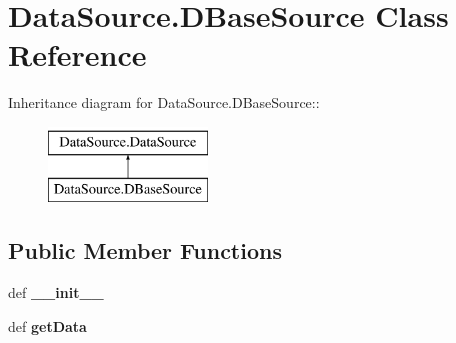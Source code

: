 \hypertarget{classDataSource_1_1DBaseSource}{
\section{DataSource.DBaseSource Class Reference}
\label{classDataSource_1_1DBaseSource}
}
Inheritance diagram for DataSource.DBaseSource::\begin{figure}[H]
\begin{center}
\leavevmode
\includegraphics[height=2cm]{classDataSource_1_1DBaseSource}
\end{center}
\end{figure}
\subsection*{Public Member Functions}
\begin{DoxyCompactItemize}
\item 
\hypertarget{classDataSource_1_1DBaseSource_ab3704881ab5d142ce6a8b2951bd57bd6}{
def {\bfseries \_\-\_\-init\_\-\_\-}}
\label{classDataSource_1_1DBaseSource_ab3704881ab5d142ce6a8b2951bd57bd6}

\item 
\hypertarget{classDataSource_1_1DBaseSource_a0db468d8ece8092b352ad5a1745597e3}{
def {\bfseries getData}}
\label{classDataSource_1_1DBaseSource_a0db468d8ece8092b352ad5a1745597e3}

\end{DoxyCompactItemize}
